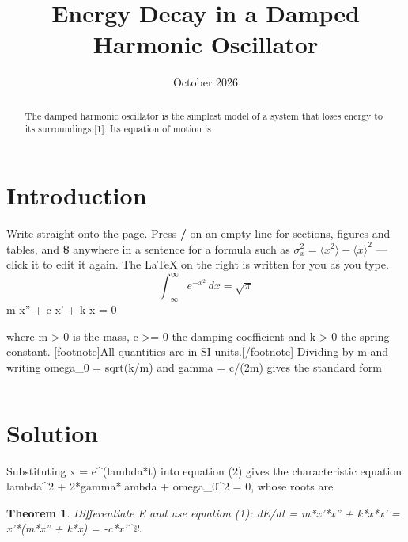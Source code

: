 \documentclass[11pt,a4paper]{article}
\title{Energy Decay in a Damped Harmonic Oscillator}
\date{October 2026}
\newtheorem{theorem}{Theorem}
\begin{document}
\maketitle

\begin{abstract}
The damped harmonic oscillator is the simplest model of a system that loses energy to its surroundings [1]. Its equation of motion is
\end{abstract}

\section{Introduction}\label{sec:intro}

Write straight onto the page. Press \textbf{/} on an empty line for sections, figures and tables, and \textbf{\$} anywhere in a sentence for a formula such as $\sigma_{x}^{2}=\langle x^{2}\rangle-\langle x\rangle^{2}$ --- click it to edit it again. The LaTeX on the right is written for you as you type.
\begin{equation}
  \int_{-\infty}^{\infty}e^{-x^{2}}\,dx=\sqrt{\pi}
  \label{eq:gauss}
\end{equation}
m x'' + c x' + k x = 0

where m \textgreater{} 0 is the mass, c \textgreater{}= 0 the damping coefficient and k \textgreater{} 0 the spring constant. [footnote]All quantities are in SI units.[/footnote] Dividing by m and writing omega\_0 = sqrt(k/m) and gamma = c/(2m) gives the standard form
\begin{equation}
  
\end{equation}

\begin{equation}
  
\end{equation}

\section{Solution}

Substituting x = e\textasciicircum{}(lambda*t) into equation (2) gives the characteristic equation lambda\textasciicircum{}2 + 2*gamma*lambda + omega\_0\textasciicircum{}2 = 0, whose roots are
\begin{equation}
  
\end{equation}

\begin{theorem}
  Differentiate E and use equation (1): dE/dt = m*x'*x'' + k*x*x' = x'*(m*x'' + k*x) = -c*x'\textasciicircum{}2.
\end{theorem}
\end{document}
